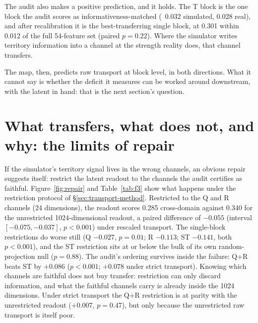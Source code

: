 The audit also makes a positive prediction, and it holds. The T block is the one block the audit scores as informativeness-matched (\etasq\ 0.032 simulated, 0.028 real), and after recalibration it is the best-transferring single block, at 0.301 within 0.012 of the full 54-feature set (paired $p=0.22$). Where the simulator writes territory information into a channel at the strength reality does, that channel transfers. 

The map, then, predicts raw transport at block level, in both directions. What it cannot say is whether the deficit it measures can be worked around downstream, with the latent in hand: that is the next section's question. 

\section[The limits of repair]{What transfers, what does not, and why: the limits of repair}
\label{sec:res-repair}

If the simulator's territory signal lives in the wrong channels, an obvious repair suggests itself: restrict the latent readout to the channels the audit certifies as faithful. Figure~\ref{fig:repair} and Table~\ref{tab:f3} show what happens under the restriction protocol of \S\ref{sec:transport-method}. Restricted to the Q and R channels (24 dimensions), the readout scores 0.285 cross-domain against 0.340 for the unrestricted 1024-dimensional readout, a paired difference of $-0.055$ (interval $[-0.075, -0.037]$, $p<0.001$) under rescaled transport. The single-block restrictions do worse still (Q $-0.027$, $p=0.01$; R $-0.113$; ST $-0.141$, both $p<0.001$), and the ST restriction sits at or below the bulk of its own random-projection null ($p=0.88$). The audit's ordering survives inside the failure: Q+R beats ST by $+0.086$ ($p<0.001$; $+0.078$ under strict transport). Knowing which channels are faithful does not buy transfer: restriction can only discard information, and what the faithful channels carry is already inside the 1024 dimensions. Under strict transport the Q+R restriction is at parity with the unrestricted readout ($+0.007$, $p=0.47$), but only because the unrestricted raw transport is itself poor. 


